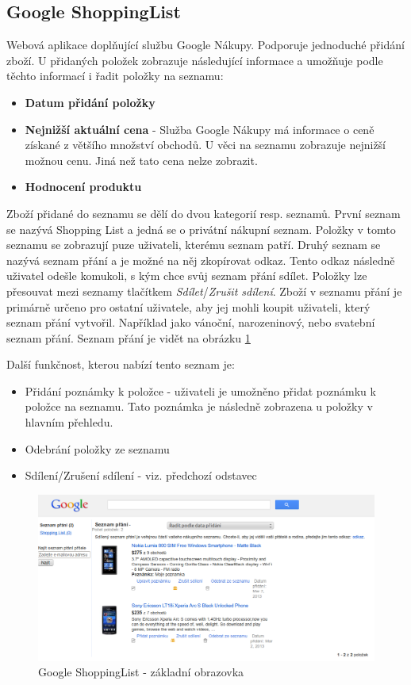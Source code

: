 \subsection{Google ShoppingList}
Webová aplikace doplňující službu Google Nákupy. Podporuje jednoduché přidání zboží. U přidaných položek zobrazuje následující informace a umožňuje podle těchto informací i řadit položky na seznamu:
\begin{itemize}
\item \textbf{Datum přidání položky}
\item \textbf{Nejnižší aktuální cena} - Služba Google Nákupy má informace o ceně získané z většího množství obchodů. U věci na seznamu zobrazuje nejnižší možnou cenu. Jiná než tato cena nelze zobrazit.
\item \textbf{Hodnocení produktu}
\end{itemize}
Zboží přidané do seznamu se dělí do dvou kategorií resp. seznamů. První seznam se nazývá Shopping List a jedná se o privátní nákupní seznam. Položky v tomto seznamu se zobrazují puze uživateli, kterému seznam patří. Druhý seznam se nazývá seznam přání a je možné na něj zkopírovat odkaz. Tento odkaz následně uživatel odešle komukoli, s kým chce svůj seznam přání sdílet. Položky lze přesouvat mezi seznamy tlačítkem \emph{Sdílet}/\emph{Zrušit sdílení}.
Zboží v seznamu přání je primárně určeno pro ostatní uživatele, aby jej mohli koupit uživateli, který seznam přání vytvořil. Například jako vánoční, narozeninový, nebo svatební seznam přání. Seznam přání je vidět na obrázku \ref{fig:google-shoppinglist}

Další funkčnost, kterou nabízí tento seznam je:
\begin{itemize}
\item Přidání poznámky k položce - uživateli je umožněno přidat poznámku k položce na seznamu.  Tato poznámka je následně zobrazena u položky v hlavním přehledu.
\item Odebrání položky ze seznamu
\item Sdílení/Zrušení sdílení - viz. předchozí odstavec
\end{itemize}

\begin{figure}[htb]
\begin{center}
\includegraphics[width=120mm]{./pictures/google-shopping-list.png}
\caption{Google ShoppingList - základní obrazovka}
\label{fig:google-shoppinglist}
\end{center}
\end{figure}

